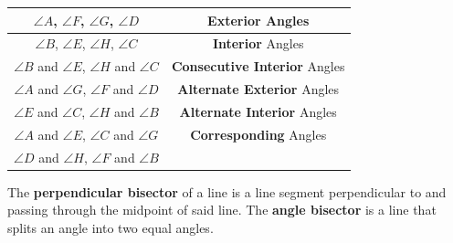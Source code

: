         \begin{center}
            \begin{tabular} {|c|c|}
                \hline
                $\angle A$, $\angle F$, $\angle G$, $\angle D$ & \textbf{Exterior} Angles \\
                \hline
                $\angle B$, $\angle E$, $\angle H$, $\angle C$ & \textbf{Interior} Angles \\
                \hline
                $\angle B$ and $\angle E$, $\angle H$ and $\angle C$ &\textbf{Consecutive Interior} Angles \\
                \hline
                $\angle A$ and $\angle G$, $\angle F$ and $\angle D$ & \textbf{Alternate Exterior} Angles \\
                \hline
                $\angle E$ and $\angle C$, $\angle H$ and $\angle B$ & \textbf{Alternate Interior} Angles \\
                \hline
                $\angle A$ and $\angle E$, $\angle C$ and $\angle G$ & \textbf{Corresponding} Angles \\
                $\angle D$ and $\angle H$, $\angle F$ and $\angle B$ & \\
                \hline
            \end{tabular}
        \end{center}

        \noindent The \textbf{perpendicular bisector} of a line is a line segment perpendicular
        to and passing through the midpoint of said line. The \textbf{angle bisector} is a line
        that splits an angle into two equal angles.